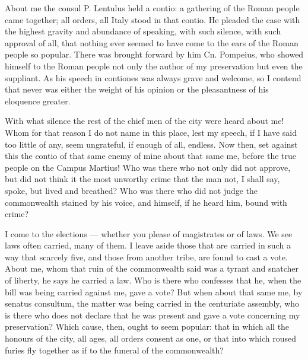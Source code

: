  About me the consul P. Lentulus held a contio: a gathering of the Roman people came together; all orders, all Italy stood in that contio. He pleaded the case with the highest gravity and abundance of speaking, with such silence, with such approval of all, that nothing ever seemed to have come to the ears of the Roman people so popular. There was brought forward by him Cn. Pompeius, who showed himself to the Roman people not only the author of my preservation but even the suppliant. As his speech in contiones was always grave and welcome, so I contend that never was either the weight of his opinion or the pleasantness of his eloquence greater.

 With what silence the rest of the chief men of the city were heard about me! Whom for that reason I do not name in this place, lest my speech, if I have said too little of any, seem ungrateful, if enough of all, endless. Now then, set against this the contio of that same enemy of mine about that same me, before the true people on the Campus Martius! Who was there who not only did not approve, but did not think it the most unworthy crime that the man not, I shall say, spoke, but lived and breathed? Who was there who did not judge the commonwealth stained by his voice, and himself, if he heard him, bound with crime?

 I come to the elections --- whether you please of magistrates or of laws. We see laws often carried, many of them. I leave aside those that are carried in such a way that scarcely five, and those from another tribe, are found to cast a vote. About me, whom that ruin of the commonwealth said was a tyrant and snatcher of liberty, he says he carried a law. Who is there who confesses that he, when the bill was being carried against me, gave a vote? But when about that same me, by senatus consultum, the matter was being carried in the centuriate assembly, who is there who does not declare that he was present and gave a vote concerning my preservation? Which cause, then, ought to seem popular: that in which all the honours of the city, all ages, all orders consent as one, or that into which roused furies fly together as if to the funeral of the commonwealth?

